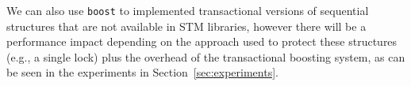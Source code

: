 \documentclass{llncs}
\begin{document}
We can also use {\tt boost} to implemented transactional versions of sequential structures that
are not available in STM libraries,  however there will be a performance impact depending
on the approach used to protect these structures (e.g., a single lock) plus the overhead
of the transactional boosting system, as can be seen in the experiments in Section~\ref{sec:experiments}.





%

%
%
\end{document}
